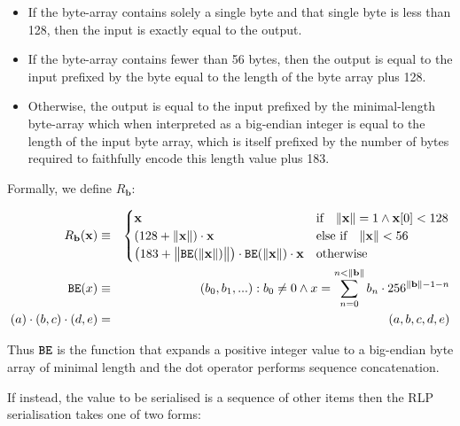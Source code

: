 \documentclass[9pt,oneside]{amsart}
\begin{document}
\begin{itemize}
\item If the byte-array contains solely a single byte and that single byte is less than 128, then the input is exactly equal to the output.
\item If the byte-array contains fewer than 56 bytes, then the output is equal to the input prefixed by the byte equal to the length of the byte array plus 128.
\item Otherwise, the output is equal to the input prefixed by the minimal-length byte-array which when interpreted as a big-endian integer is equal to the length of the input byte array, which is itself prefixed by the number of bytes required to faithfully encode this length value plus 183.
\end{itemize}
\hypertarget{R b}{
Formally, we define $R_\mathbf{b}$:}
\begin{eqnarray}
R_\mathbf{b}(\mathbf{x}) & \equiv & \begin{cases}
\mathbf{x} & \text{if} \quad \lVert \mathbf{x} \rVert = 1 \wedge \mathbf{x}[0] < 128 \\
(128 + \lVert \mathbf{x} \rVert) \cdot \mathbf{x} & \text{else if} \quad \lVert \mathbf{x} \rVert < 56 \\
\big(183 + \big\lVert \mathtt{\tiny BE}(\lVert \mathbf{x} \rVert) \big\rVert \big) \cdot \mathtt{\tiny BE}(\lVert \mathbf{x} \rVert) \cdot \mathbf{x} & \text{otherwise}
\end{cases} \\
\mathtt{\tiny BE}(x) & \equiv & (b_0, b_1, ...): b_0 \neq 0 \wedge x = \sum_{n = 0}^{n < \lVert \mathbf{b} \rVert} b_n \cdot 256^{\lVert \mathbf{b} \rVert - 1 - n} \\
(a) \cdot (b, c) \cdot (d, e) & = & (a, b, c, d, e)
\end{eqnarray}

Thus $\mathtt{\tiny BE}$ is the function that expands a positive integer value to a big-endian byte array of minimal length and the dot operator performs sequence concatenation.

If instead, the value to be serialised is a sequence of other items then the RLP serialisation takes one of two forms:
\end{document}
